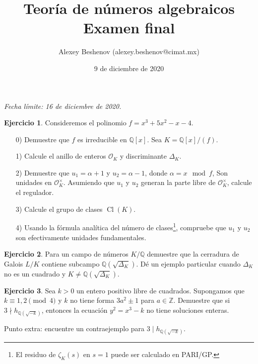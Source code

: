 \documentclass{article}
\title{Teoría de números algebraicos\\Examen final}
\author{Alexey Beshenov (alexey.beshenov@cimat.mx)}
\date{9 de diciembre de 2020}
\theoremstyle{definition}
\newtheorem{ejercicio}{Ejercicio}
\DeclareMathOperator{\Cl}{Cl}
\newcommand{\ZZ}{\mathbb{Z}}
\newcommand{\QQ}{\mathbb{Q}}
\renewcommand{\O}{\mathcal{O}}
\begin{document}
{\sffamily\bfseries\maketitle}

\ifdefined\solutions
\else
\thispagestyle{empty}
\fi

\noindent\emph{Fecha límite: 16 de diciembre de 2020.}

\begin{ejercicio}
  Consideremos el polinomio $f = x^3 + 5x^2 - x - 4$.

  \begin{enumerate}
  \item[0)] Demuestre que $f$ es irreducible en $\QQ [x]$.
    Sea $K = \QQ [x]/(f)$.

  \item[1)] Calcule el anillo de enteros $\O_K$ y discriminante $\Delta_K$.

  \item[2)] Demuestre que $u_1 = \alpha + 1$ y $u_2 = \alpha - 1$, donde
    $\alpha = x \mod f$, Son unidades en $\O_K^\times$. Asumiendo que $u_1$ y
    $u_2$ generan la parte libre de $\O_K^\times$, calcule el regulador.

  \item[3)] Calcule el grupo de clases $\Cl (K)$.

  \item[4)] Usando la fórmula analítica del número de clases\footnote{El residuo
      de $\zeta_K (s)$ en $s=1$ puede ser calculado en PARI/GP.}, compruebe que
    $u_1$ y $u_2$ son efectivamente unidades fundamentales.
  \end{enumerate}
\end{ejercicio}

\begin{ejercicio}
  Para un campo de números $K/\QQ$ demuestre que la cerradura de Galois $L/K$
  contiene subcampo $\QQ (\sqrt{\Delta_K})$. Dé un ejemplo particular cuando
  $\Delta_K$ no es un cuadrado y $K \ne \QQ (\sqrt{\Delta_K})$.
\end{ejercicio}

\begin{ejercicio}
  Sea $k > 0$ un entero positivo libre de cuadrados. Supongamos que
  $k \equiv 1,2 \pmod{4}$ y $k$ no tiene forma $3a^2 \pm 1$ para $a \in \ZZ$.
  Demuestre que si $3 \nmid h_{\QQ (\sqrt{-k})}$, entonces la ecuación
  $y^2 = x^3 - k$ no tiene soluciones enteras.

  Punto extra: encuentre un contraejemplo para $3 \mid h_{\QQ (\sqrt{-k})}$.
\end{ejercicio}
\end{document}

